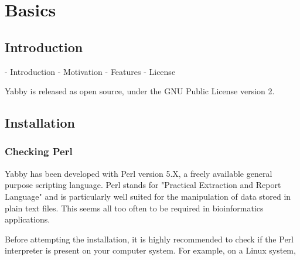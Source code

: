

\setcounter{section}{0}

\chapter{Basics}

\section{Introduction}

- Introduction
- Motivation
- Features
- License

Yabby is released as open source, under the GNU Public License
version 2.

\section{Installation}

\subsection{Checking Perl}


Yabby has been developed with Perl version 5.X, a freely available
general purpose scripting language. Perl stands for "Practical
Extraction and Report Language" and is particularly well suited for
the manipulation of data stored in plain text files. This seems
all too often to be required in bioinformatics applications.

Before attempting the installation, it is highly recommended to
check if the Perl interpreter is present on your computer system.
For example, on a Linux system,

